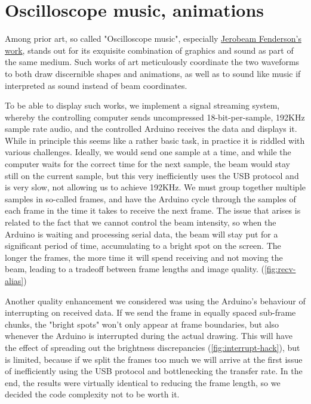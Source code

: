 \documentclass[12pt]{article}
\begin{document}
\section{Oscilloscope music, animations}

Among prior art, so called "Oscilloscope music", especially \href{https://www.youtube.com/playlist?list=PLFgoUhNvMLrr8izq38HX6rjFR-nkfklxw}{Jerobeam Fenderson's work}, stands out for its exquisite combination of graphics and sound as part of the same medium. Such works of art meticulously coordinate the two waveforms to both draw discernible shapes and animations, as well as to sound like music if interpreted as sound instead of beam coordinates.

To be able to display such works, we implement a signal streaming system, whereby the controlling computer sends uncompressed 18-bit-per-sample, 192KHz sample rate audio, and the controlled Arduino receives the data and displays it. While in principle this seems like a rather basic task, in practice it is riddled with various challenges. Ideally, we would send one sample at a time, and while the computer waits for the correct time for the next sample, the beam would stay still on the current sample, but this very inefficiently uses the USB protocol and is very slow, not allowing us to achieve 192KHz. We must group together multiple samples in so-called frames, and have the Arduino cycle through the samples of each frame in the time it takes to receive the next frame. The issue that arises is related to the fact that we cannot control the beam intensity, so when the Arduino is waiting and processing serial data, the beam will stay put for a significant period of time, accumulating to a bright spot on the screen. The longer the frames, the more time it will spend receiving and not moving the beam, leading to a tradeoff between frame lengths and image quality. (\autoref{fig:recv-alias})

Another quality enhancement we considered was using the \mbox{Arduino's} behaviour of interrupting on received data. If we send the frame in equally spaced sub-frame chunks, the "bright spots" won't only appear at frame boundaries, but also whenever the Arduino is interrupted during the actual drawing. This will have the effect of spreading out the brightness discrepancies (\autoref{fig:interrupt-hack}), but is limited, because if we split the frames too much we will arrive at the first issue of inefficiently using the USB protocol and bottlenecking the transfer rate. In the end, the results were virtually identical to reducing the frame length, so we decided the code complexity not to be worth it.
\end{document}

